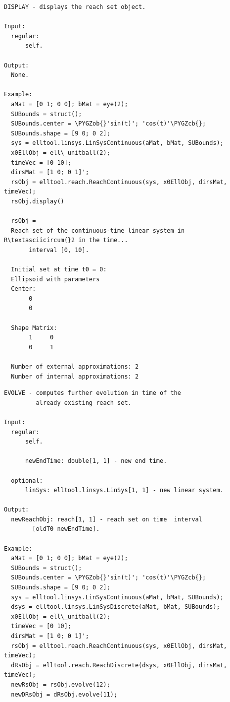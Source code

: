 \documentclass[letterpaper,10pt,english]{sphinxmanual}
\def\PYGZob{\char`\{}
\def\PYGZcb{\char`\}}
\begin{document}
\begin{Verbatim}[commandchars=\\\{\}]
DISPLAY - displays the reach set object.

Input:
  regular:
      self.

Output:
  None.

Example:
  aMat = [0 1; 0 0]; bMat = eye(2);
  SUBounds = struct();
  SUBounds.center = \PYGZob{}'sin(t)'; 'cos(t)'\PYGZcb{};
  SUBounds.shape = [9 0; 0 2];
  sys = elltool.linsys.LinSysContinuous(aMat, bMat, SUBounds);
  x0EllObj = ell\_unitball(2);
  timeVec = [0 10];
  dirsMat = [1 0; 0 1]';
  rsObj = elltool.reach.ReachContinuous(sys, x0EllObj, dirsMat, timeVec);
  rsObj.display()

  rsObj =
  Reach set of the continuous-time linear system in R\textasciicircum{}2 in the time...
       interval [0, 10].

  Initial set at time t0 = 0:
  Ellipsoid with parameters
  Center:
       0
       0

  Shape Matrix:
       1     0
       0     1

  Number of external approximations: 2
  Number of internal approximations: 2
\end{Verbatim}

\begin{Verbatim}[commandchars=\\\{\}]
EVOLVE - computes further evolution in time of the
         already existing reach set.

Input:
  regular:
      self.

      newEndTime: double[1, 1] - new end time.

  optional:
      linSys: elltool.linsys.LinSys[1, 1] - new linear system.

Output:
  newReachObj: reach[1, 1] - reach set on time  interval
        [oldT0 newEndTime].

Example:
  aMat = [0 1; 0 0]; bMat = eye(2);
  SUBounds = struct();
  SUBounds.center = \PYGZob{}'sin(t)'; 'cos(t)'\PYGZcb{};
  SUBounds.shape = [9 0; 0 2];
  sys = elltool.linsys.LinSysContinuous(aMat, bMat, SUBounds);
  dsys = elltool.linsys.LinSysDiscrete(aMat, bMat, SUBounds);
  x0EllObj = ell\_unitball(2);
  timeVec = [0 10];
  dirsMat = [1 0; 0 1]';
  rsObj = elltool.reach.ReachContinuous(sys, x0EllObj, dirsMat, timeVec);
  dRsObj = elltool.reach.ReachDiscrete(dsys, x0EllObj, dirsMat, timeVec);
  newRsObj = rsObj.evolve(12);
  newDRsObj = dRsObj.evolve(11);
\end{Verbatim}
\end{document}
